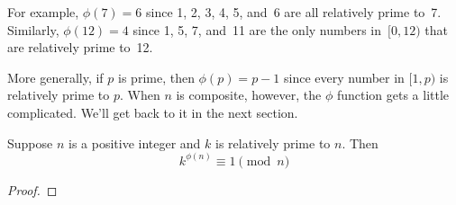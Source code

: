 For example, $\phi(7) = 6$ since 1, 2, 3, 4, 5, and~6
are all relatively prime to~7.  Similarly, $\phi(12) = 4$ since 1, 5,
7, and~11 are the only numbers in~$[0, 12)$ that are relatively prime
  to~12.

More generally, if $p$ is prime, then $\phi(p) = p - 1$ since every
number in $[1,p)$ is relatively prime to $p$.  When $n$ is composite,
  however, the $\phi$ function gets a little complicated.  We'll get
  back to it in the next section.

\begin{theorem}
Suppose $n$ is a positive integer and $k$ is relatively prime to $n$.  Then
\begin{equation*}
    k^{\phi(n)} \equiv 1 \pmod{n}
\end{equation*}
\end{theorem}

\begin{proof}
\end{proof}

